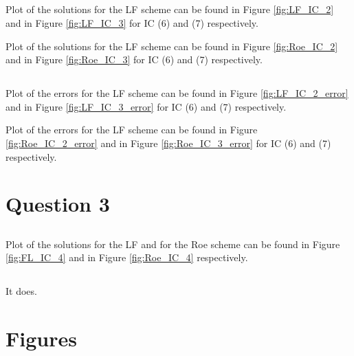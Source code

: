 \documentclass[11pt,a4paper]{article}
\begin{document}
\subsection{}
Plot of the solutions for the LF scheme can be found in Figure \ref{fig:LF_IC_2} and in Figure \ref{fig:LF_IC_3} for IC (6) and (7) respectively.

Plot of the solutions for the LF scheme can be found in Figure \ref{fig:Roe_IC_2} and in Figure \ref{fig:Roe_IC_3} for IC (6) and (7) respectively.


\subsection{}
\subsection{}

Plot of the errors for the LF scheme can be found in Figure \ref{fig:LF_IC_2_error} and in Figure \ref{fig:LF_IC_3_error} for IC (6) and (7) respectively.

Plot of the errors for the LF scheme can be found in Figure \ref{fig:Roe_IC_2_error} and in Figure \ref{fig:Roe_IC_3_error} for IC (6) and (7) respectively.


\section{Question 3}

\subsection{}
Plot of the solutions for the LF and for the Roe scheme can be found in Figure \ref{fig:FL_IC_4} and in Figure \ref{fig:Roe_IC_4} respectively.

\subsection{}

It does. 

\newpage
\section{Figures}
\end{document}
